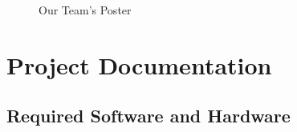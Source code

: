 \documentclass[onecolumn, draftclsnofoot,10pt, compsoc]{IEEEtran}
\begin{document}
\begin{figure}[hbtp]
    \caption{Our Team's Poster}
\end{figure}

\newpage

\section{Project Documentation}

\subsection{Required Software and Hardware}
\end{document}
